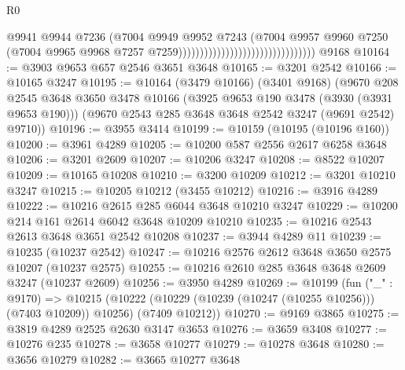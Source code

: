 \begin{lexlean}{R0}
\begin{coremodule}
                                                              @9941
                                                              @9944
                                                              @7236
                                                              (@7004
                                                                @9949
                                                                @9952
                                                                @7243
                                                                (@7004
                                                                  @9957
                                                                  @9960
                                                                  @7250
                                                                  (@7004
                                                                    @9965
                                                                    @9968
                                                                    @7257
                                                                    @7259))))))))))))))))))))))))))))))))
    @9168
@10164 := @3903 @9653 @657 @2546 @3651 @3648
@10165 := @3201 @2542
@10166 := @10165 @3247
@10195 := @10164
    (@3479 @10166)
    (@3401 @9168)
    (@9670
      @208
      @2545
      @3648
      @3650
      @3478
      @10166
      (@3925 @9653 @190 @3478 (@3930 (@3931 @9653 @190)))
      (@9670 @2543 @285 @3648 @3648 @2542 @3247 (@9691 @2542) @9710))
@10196 := @3955 @3414
@10199 := @10159 (@10195 (@10196 @160))
@10200 := @3961 @4289
@10205 := @10200 @587 @2556 @2617 @6258 @3648
@10206 := @3201 @2609
@10207 := @10206 @3247
@10208 := @8522 @10207
@10209 := @10165 @10208
@10210 := @3200 @10209
@10212 := @3201 @10210 @3247
@10215 := @10205 @10212 (@3455 @10212)
@10216 := @3916 @4289
@10222 := @10216 @2615 @285 @6044 @3648 @10210 @3247
@10229 := @10200 @214 @161 @2614 @6042 @3648 @10209 @10210
@10235 := @10216 @2543 @2613 @3648 @3651 @2542 @10208
@10237 := @3944 @4289 @11
@10239 := @10235 (@10237 @2542)
@10247 := @10216 @2576 @2612 @3648 @3650 @2575 @10207 (@10237 @2575)
@10255 := @10216 @2610 @285 @3648 @3648 @2609 @3247 (@10237 @2609)
@10256 := @3950 @4289
@10269 := @10199
    (fun ("_" : @9170) =>
    @10215 (@10222 (@10229 (@10239 (@10247 (@10255 @10256))) (@7403 @10209)) @10256) (@7409 @10212))
@10270 := @9169 @3865
@10275 := @3819 @4289 @2525 @2630 @3147 @3653
@10276 := @3659 @3408
@10277 := @10276 @235
@10278 := @3658 @10277
@10279 := @10278 @3648
@10280 := @3656 @10279
@10282 := @3665 @10277 @3648

\end{coremodule}
\end{lexlean}

